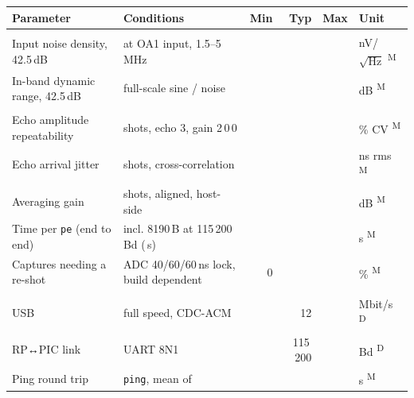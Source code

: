 \documentclass[10pt,a4paper]{article}
\makeatletter
\newcommand{\cmd}[1]{\texttt{#1}}
\newcommand{\meas}{\textsuperscript{M}}
\newcommand{\des}{\textsuperscript{D}}
\newenvironment{spec}[1]{%
  \small\begin{longtable}{@{}>{\raggedright\arraybackslash}p{50mm}>{\raggedright\arraybackslash}p{55mm}rrrl@{}}
  \toprule\textbf{Parameter} & \textbf{Conditions} & \textbf{Min} & \textbf{Typ} & \textbf{Max} & \textbf{Unit}\\\midrule\endhead
  \multicolumn{6}{@{}l}{\color{accent}\bfseries #1}\\}{\bottomrule\end{longtable}}
\newcommand{\grp}[1]{\multicolumn{6}{@{}l}{\color{accent}\bfseries #1}\\}
\makeatother
\begin{document}
\begin{spec}{Transmit (pulser)}
Input noise density, 42.5\,dB & at OA1 input, 1.5–5\,MHz & & \veninmax & & nV/$\sqrt{\text{Hz}}$ \meas\\
In-band dynamic range, 42.5\,dB & full-scale sine / noise & & \vdrmax & & dB \meas\\
\grp{Repeatability and throughput}
Echo amplitude repeatability & 16 shots, echo 3, gain 2\,0\,0 & & \vampcv & & \% CV \meas\\
Echo arrival jitter & 16 shots, cross-correlation & & \vjitter & & ns rms \meas\\
Averaging gain & 8 shots, aligned, host-side & & \vavggain & & dB \meas\\
Time per \cmd{pe} (end to end) & incl. 8190\,B at 115\,200\,Bd (\vxfer\,s) & & \vpetime & & s \meas\\
Captures needing a re-shot & ADC 40/60/60\,ns lock, build dependent & 0 & & \vretryrate & \% \meas\\
\grp{Link and control}
USB & full speed, CDC-ACM & & 12 & & Mbit/s \des\\
RP↔PIC link & UART 8N1 & & 115\,200 & & Bd \des\\
Ping round trip & \cmd{ping}, mean of \vpingn & & \vpingus & & \textmu s \meas\\
\end{spec}

\clearpage
\end{document}
